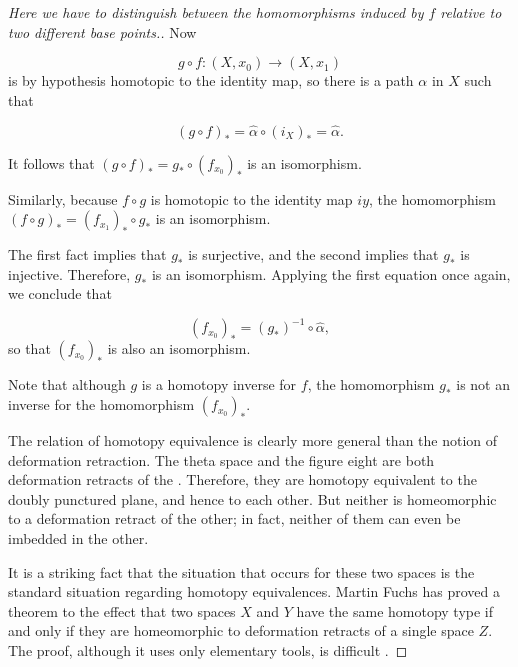 \begin{proof}
[Here we have to distinguish between the homomorphisms induced by \(f\) relative to two different base points.] Now

\[
g \circ f : ( {X,x_{0}}) \rightarrow ( {X,x_{1}})
\]
is by hypothesis homotopic to the identity map, so there is a path \(\alpha\) in \(X\) such that

\[
{( g \circ f) }_{ * } = \hat{\alpha } \circ {( i_X ) }_{ * } = \hat{\alpha }.
\]

It follows that \({( g \circ f) }_{ * } = g_{ * } \circ {( f_{x_{0}}) }_{ * }\) is an isomorphism.

Similarly, because \(f \circ g\) is homotopic to the identity map \({iy}\), the homomorphism \({( f \circ g) }_{ * } = {( f_{x_{1}}) }_{ * } \circ {g}_{ * }\) is an isomorphism.

The first fact implies that \(g_{ * }\) is surjective, and the second implies that \(g_{ * }\) is injective. Therefore, \(g_{ * }\) is an isomorphism. Applying the first equation once again, we conclude that

\[
{( f_{x_{0}}) }_{ * } = {( g_{ * }) }^{-1} \circ \hat{\alpha },
\]
so that \({( f_{x_{0}}) }_{ * }\) is also an isomorphism.

Note that although \(g\) is a homotopy inverse for \(f\), the homomorphism \(g_{ * }\) is not an inverse for the homomorphism \({( f_{x_{0}}) }_{ * }\).

The relation of homotopy equivalence is clearly more general than the notion of deformation retraction. The theta space and the figure eight are both deformation retracts of the . Therefore, they are homotopy equivalent to the doubly punctured plane, and hence to each other. But neither is homeomorphic to a deformation retract of the other; in fact, neither of them can even be imbedded in the other.

It is a striking fact that the situation that occurs for these two spaces is the standard situation regarding homotopy equivalences. Martin Fuchs has proved a theorem to the effect that two spaces \(X\) and \(Y\) have the same homotopy type if and only if they are homeomorphic to deformation retracts of a single space \(Z\). The proof, although it uses only elementary tools, is difficult \cite{Fuchs1971}.
\end{proof}
